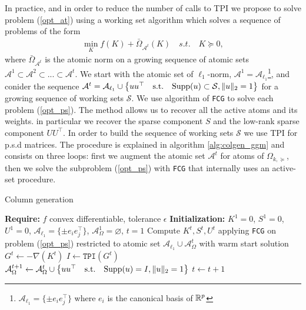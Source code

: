 In practice, and in order to reduce the number of calls to TPI we propose to solve problem (\ref{opt_at}) using a working set algorithm which solves a sequence
of problems of the form 
\begin{align}
\label{opt_ps}
\min_{K} f(K)+ \bar{\Omega}_{\mathcal{A}^{t}}(K) \quad s.t. \quad K \succeq 0,
\end{align}
where $\bar{\Omega}_{\mathcal{A}^{t}}$ is the atomic norm on a growing sequence of atomic sets $\mathcal{A}^{1}\subset \mathcal{A}^{2} \subset ... \subset \mathcal{A}^{t}$. We start with the atomic set of $\ell_1$-norm, $\mathcal{A}^{1}=\mathcal{A}_{\ell_{1}}$\footnote{$\mathcal{A}_{\ell_{1}}=\{\pm e_i e_j^{\top}\}$ where $e_i$ is the canonical basis of $\mathbb{R}^p$}, and conider the sequence $\mathcal{A}^{t}=\mathcal{A}_{\ell_{1}}\cup \big\{uu^{\top} \quad \text{s.t.} \quad {\rm Supp}(u)\subset \mathcal{S}, \|u\|_{2}=1 \big\}$ for a growing sequence of working sets $\mathcal{S}$. We use algorithm of \texttt{FCG} to solve each problem (\ref{opt_ps}). The method allows us to recover all the active atoms and its weights. in particular we recover the sparse component $S$ and the low-rank sparse component $UU^{\top}$.  In order to build the  sequence of working sets $\mathcal{S}$ we use TPI for p.s.d matrices.  The procedure is explained in algorithm \ref{alg:colgen_ggm} and consists on three loops: first we augment the atomic set $\mathcal{A}^{t}$ for atoms of  $\Omega_{k,\succeq}$, then we solve the subproblem (\ref{opt_ps}) with \texttt{FCG} that internally uses an active-set procedure.


\begin{algorithm}
\caption{Column generation}
\label{alg:colgen_ggm}
\begin{algorithmic}[1]
\State\textbf{Require: } $f$ convex differentiable, tolerance $\epsilon$ 
\State\textbf{Initialization: } $K^{1}=0$,  $S^{1}=0$, $U^{1}=0$, $\mathcal{A}_{\ell_{1}}=\{\pm e_i e_j^{\top}\}$, $\mathcal{A}^{1}_{\Omega}=\varnothing$, $t=1$
\State Compute $K^{t},S^{t},U^{t}$ applying \texttt{FCG} on problem (\ref{opt_ps}) restricted to atomic set $\mathcal{A}_{\ell_{1}} \cup \mathcal{A}_{\Omega}^{t}$ with warm start solution
\State $G^{t}\gets -\nabla(K^t)$
\State $I \gets \texttt{TPI}(G^{t})$
\State $\mathcal{A}_{\Omega}^{t+1}\gets \mathcal{A}_{\Omega}^{t}
 \cup \big\{uu^{\top} \quad \text{s.t.} \quad {\rm Supp}(u)=I, \|u\|_{2}=1 \big\} $
\EndIf
\State $t \gets t+1$
\EndWhile
\end{algorithmic}
  \end{algorithm}


